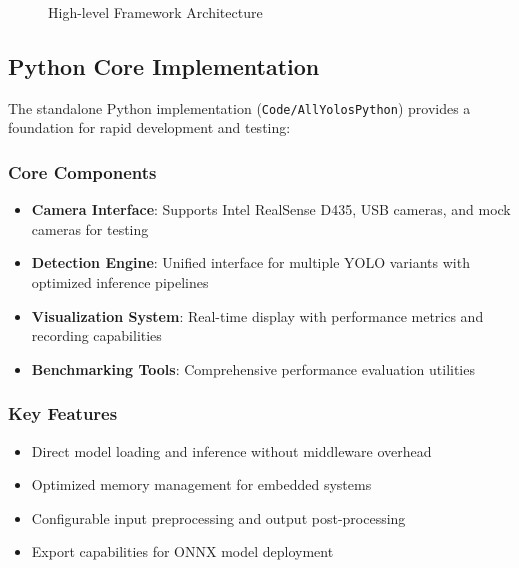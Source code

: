 \documentclass[11pt,a4paper]{article}
\begin{document}
\begin{figure}[H]
    \caption{High-level Framework Architecture}
    \label{fig:framework-architecture}
\end{figure}

\subsection{Python Core Implementation}

The standalone Python implementation (\texttt{Code/AllYolosPython}) provides a foundation for rapid development and testing:

\subsubsection{Core Components}
\begin{itemize}
    \item \textbf{Camera Interface}: Supports Intel RealSense D435, USB cameras, and mock cameras for testing
    \item \textbf{Detection Engine}: Unified interface for multiple YOLO variants with optimized inference pipelines
    \item \textbf{Visualization System}: Real-time display with performance metrics and recording capabilities
    \item \textbf{Benchmarking Tools}: Comprehensive performance evaluation utilities
\end{itemize}

\subsubsection{Key Features}
\begin{itemize}
    \item Direct model loading and inference without middleware overhead
    \item Optimized memory management for embedded systems
    \item Configurable input preprocessing and output post-processing
    \item Export capabilities for ONNX model deployment
\end{itemize}
\end{document}
